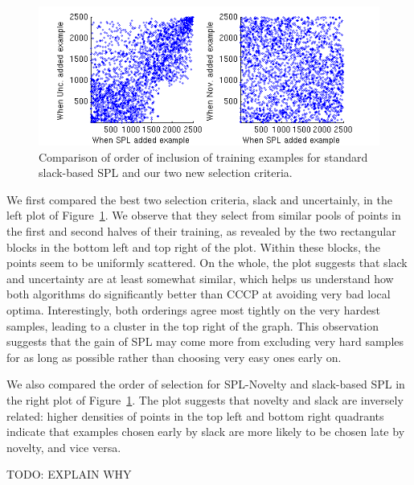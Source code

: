\documentclass{article}
\begin{document}
\begin{figure}
\includegraphics{ordercomp.png}
\caption{Comparison of order of inclusion of training examples for standard slack-based SPL and our two new selection criteria.}
\label{fig:order}
\end{figure}

We first compared the best two selection criteria, slack and uncertainly, in the left plot of Figure~\ref{fig:order}.  We observe that they select from similar pools of points in the first and second halves of their training, as revealed by the two rectangular blocks in the bottom left and top right of the plot. Within these blocks, the points seem to be uniformly scattered. On the whole, the plot suggests that slack and uncertainty are at least somewhat similar, which helps us understand how both algorithms do significantly better than {\sc CCCP} at avoiding very bad local optima.  Interestingly, both orderings agree most tightly on the very hardest samples, leading to a cluster in the top right of the graph.  This observation suggests that the gain of SPL may come more from excluding very hard samples for as long as possible rather than choosing very easy ones early on.

We also compared the order of selection for SPL-Novelty and slack-based SPL in the right plot of Figure~\ref{fig:order}. The plot suggests that novelty and slack are inversely related: higher densities of points in the top left and bottom right quadrants indicate that examples chosen early by slack are more likely to be chosen late by novelty, and vice versa. 

TODO: EXPLAIN WHY
\end{document}
